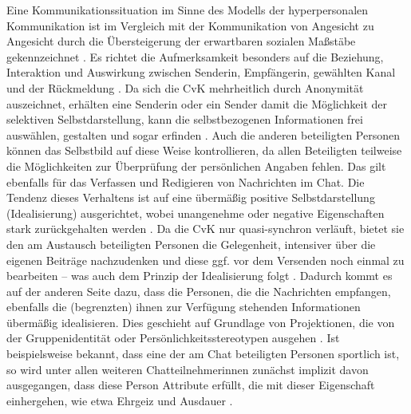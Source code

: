 \label{K2:para:hyperpersonale-kommunikation}
Eine Kommunikationssituation im Sinne des Modells der hyperpersonalen Kommunikation ist im Vergleich mit der Kommunikation von Angesicht zu Angesicht durch die Übersteigerung der erwartbaren sozialen Maßstäbe gekennzeichnet \citep[139]{misoch_online-kommunikation_2006}. Es richtet die Aufmerksamkeit besonders auf die Beziehung, Interaktion und Auswirkung zwischen Sender{\textperiodcentered}in, Empfänger{\textperiodcentered}in, gewählten Kanal und der Rückmeldung \citep[164\psq]{trepte_medienpsychologie_2012}. Da sich die CvK mehrheitlich durch Anonymität auszeichnet, erhälten eine Senderin oder ein Sender \glqq damit die Möglichkeit der selektiven Selbstdarstellung, kann die selbstbezogenen Informationen frei auswählen, gestalten und sogar erfinden\grqq{} \citep[.][165]{trepte_medienpsychologie_2012}. Auch die anderen beteiligten Personen können das Selbstbild auf diese Weise kontrollieren, da allen Beteiligten teilweise die Möglichkeiten zur Überprüfung der persönlichen Angaben fehlen. Das gilt ebenfalls für das Verfassen und Redigieren von Nachrichten im Chat. Die Tendenz dieses Verhaltens ist auf eine übermäßig positive Selbstdarstellung (Idealisierung) ausgerichtet, wobei unangenehme oder negative Eigenschaften stark zurückgehalten werden \citep[139\psq]{misoch_online-kommunikation_2006}. Da die CvK nur quasi-synchron verläuft, bietet sie den am Austausch beteiligten Personen die Gelegenheit, intensiver über die eigenen Beiträge nachzudenken und diese ggf. vor dem Versenden noch einmal zu bearbeiten -- was auch dem Prinzip der Idealisierung folgt \citep[165]{trepte_medienpsychologie_2012}. Dadurch kommt es auf der anderen Seite dazu, dass die Personen, die die Nachrichten empfangen, ebenfalls die (begrenzten) ihnen zur Verfügung stehenden Informationen übermäßig idealisieren. Dies geschieht auf Grundlage von Projektionen, die von der Gruppenidentität oder Persönlichkeitsstereotypen ausgehen \citep[4]{walther_effect_2011}. Ist beispielsweise bekannt, dass eine der am Chat beteiligten Personen sportlich ist, so wird unter allen weiteren Chatteilnehmer{\textperiodcentered}innen zunächst implizit davon ausgegangen, dass diese Person Attribute erfüllt, die mit dieser Eigenschaft einhergehen, wie etwa Ehrgeiz und Ausdauer \citep[167]{trepte_medienpsychologie_2012}.
